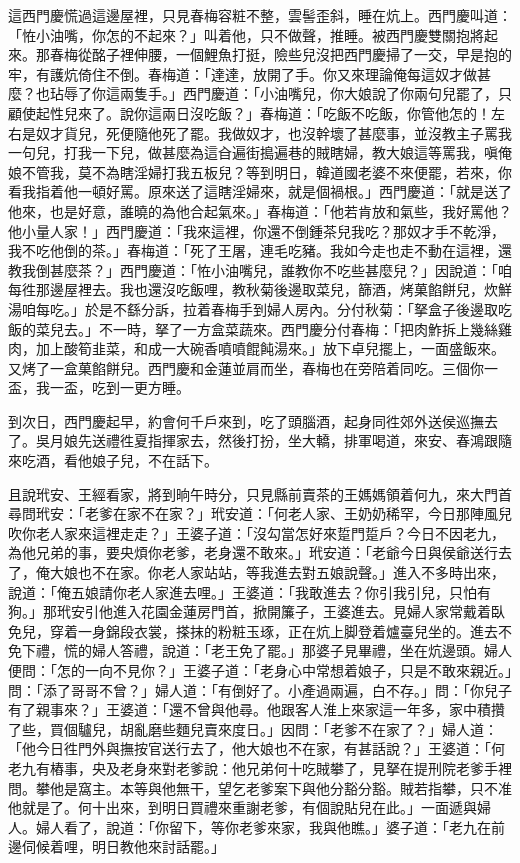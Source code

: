 這西門慶慌過這邊屋裡，只見春梅容粧不整，雲髻歪斜，睡在炕上。西門慶叫道：「恠小油嘴，你怎的不起來？」叫着他，只不做聲，推睡。被西門慶雙關抱將起來。那春梅從酩子裡伸腰，一個鯉魚打挺，險些兒沒把西門慶掃了一交，早是抱的牢，有護炕倚住不倒。春梅道：「達達，放開了手。你又來理論俺每這奴才做甚麼？也玷辱了你這兩隻手。」{}西門慶道：「小油嘴兒，你大娘說了你兩句兒罷了，只顧使起性兒來了。說你這兩日沒吃飯？」春梅道：「吃飯不吃飯，你管他怎的！左右是奴才貨兒，死便隨他死了罷。我做奴才，也沒幹壞了甚麼事，並沒教主子罵我一句兒，打我一下兒，做甚麼為這㒲遍街搗遍巷的賊瞎婦，教大娘這等罵我，嗔俺娘不管我，莫不為瞎淫婦打我五板兒？{}等到明日，韓道國老婆不來便罷，若來，你看我指着他一頓好罵。原來送了這瞎淫婦來，就是個禍根。」西門慶道：「就是送了他來，也是好意，誰曉的為他合起氣來。」春梅道：「他若肯放和氣些，我好罵他？他小量人家！」西門慶道：「我來這裡，你還不倒鍾茶兒我吃？那奴才手不乾淨，我不吃他倒的茶。」春梅道：「死了王屠，連毛吃豬。我如今走也走不動在這裡，還教我倒甚麼茶？」西門慶道：「恠小油嘴兒，誰教你不吃些甚麼兒？」因說道：「咱每徃那邊屋裡去。我也還沒吃飯哩，教秋菊後邊取菜兒，篩酒，烤菓餡餅兒，炊鮮湯咱每吃。」於是不繇分訴，拉着春梅手到婦人房內。分付秋菊：「拏盒子後邊取吃飯的菜兒去。」不一時，拏了一方盒菜蔬來。西門慶分付春梅：「把肉鮓拆上幾絲雞肉，加上酸筍韭菜，和成一大碗香噴噴餛飩湯來。」放下卓兒擺上，一面盛飯來。又烤了一盒菓餡餅兒。西門慶和金蓮並肩而坐，春梅也在旁陪着同吃。三個你一盃，我一盃，吃到一更方睡。

到次日，西門慶起早，約會何千戶來到，吃了頭腦酒，起身同徃郊外送侯巡撫去了。吳月娘先送禮徃夏指揮家去，然後打扮，坐大轎，排軍喝道，來安、春鴻跟隨來吃酒，看他娘子兒，不在話下。

且說玳安、王經看家，將到晌午時分，只見縣前賣茶的王媽媽領着何九，來大門首尋問玳安：「老爹在家不在家？」玳安道：「何老人家、王奶奶稀罕，今日那陣風兒吹你老人家來這裡走走？」王婆子道：「沒勾當怎好來踅門踅戶？今日不因老九，為他兄弟的事，要央煩你老爹，老身還不敢來。」玳安道：「老爺今日與侯爺送行去了，俺大娘也不在家。你老人家站站，等我進去對五娘說聲。」進入不多時出來，說道：「俺五娘請你老人家進去哩。」王婆道：「我敢進去？你引我引兒，只怕有狗。」那玳安引他進入花園金蓮房門首，掀開簾子，王婆進去。見婦人家常戴着臥免兒，穿着一身錦段衣裳，搽抹的粉粧玉琢，正在炕上脚登着爐臺兒坐的。進去不免下禮，慌的婦人答禮，說道：「老王免了罷。」{}那婆子見畢禮，坐在炕邊頭。婦人便問：「怎的一向不見你？」王婆子道：「老身心中常想着娘子，只是不敢來親近。」問：「添了哥哥不曾？」婦人道：「有倒好了。小產過兩遍，白不存。」問：「你兒子有了親事來？」王婆道：「還不曾與他尋。他跟客人淮上來家這一年多，家中積攢了些，買個驢兒，胡亂磨些麵兒賣來度日。」因問：「老爹不在家了？」婦人道：「他今日徃門外與撫按官送行去了，他大娘也不在家，有甚話說？」王婆道：「何老九有樁事，央及老身來對老爹說：他兄弟何十吃賊攀了，{}見拏在提刑院老爹手裡問。攀他是窩主。本等與他無干，望乞老爹案下與他分豁分豁。賊若指攀，只不准他就是了。何十出來，到明日買禮來重謝老爹，有個說貼兒在此。」一面遞與婦人。婦人看了，說道：「你留下，等你老爹來家，我與他瞧。」婆子道：「老九在前邊伺候着哩，明日教他來討話罷。」

